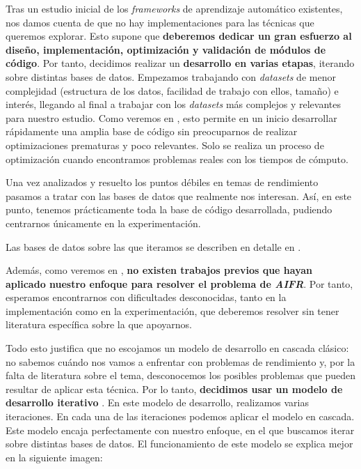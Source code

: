 Tras un estudio inicial de los \textit{frameworks} de aprendizaje automático existentes, nos damos cuenta de que no hay implementaciones para las técnicas que queremos explorar. Esto supone que \textbf{deberemos dedicar un gran esfuerzo al diseño, implementación, optimización y validación de módulos de código}. Por tanto, decidimos realizar un \textbf{desarrollo en varias etapas}, iterando sobre distintas bases de datos. Empezamos trabajando con \textit{datasets} de menor complejidad (estructura de los datos, facilidad de trabajo con ellos, tamaño) e interés, llegando al final a trabajar con los \textit{datasets} más complejos y relevantes para nuestro estudio. Como veremos en , esto permite en un inicio desarrollar rápidamente una amplia base de código sin preocuparnos de realizar optimizaciones prematuras y poco relevantes. Solo se realiza un proceso de optimización cuando encontramos problemas reales con los tiempos de cómputo.

Una vez analizados y resuelto los puntos débiles en temas de rendimiento pasamos a tratar con las bases de datos que realmente nos interesan. Así, en este punto, tenemos prácticamente toda la base de código desarrollada, pudiendo centrarnos únicamente en la experimentación.

Las bases de datos sobre las que iteramos se describen en detalle en .

Además, como veremos en , \textbf{no existen trabajos previos que hayan aplicado nuestro enfoque para resolver el problema de \textit{AIFR}}. Por tanto, esperamos encontrarnos con dificultades desconocidas, tanto en la implementación como en la experimentación, que deberemos resolver sin tener literatura específica sobre la que apoyarnos.

Todo esto justifica que no escojamos un modelo de desarrollo en cascada clásico: no sabemos cuándo nos vamos a enfrentar con problemas de rendimiento y, por la falta de literatura sobre el tema, desconocemos los posibles problemas que pueden resultar de aplicar esta técnica. Por lo tanto, \textbf{decidimos usar un modelo de desarrollo iterativo} \cite{informatica:libro_metodologias_desarrollo}. En este modelo de desarrollo, realizamos varias iteraciones. En cada una de las iteraciones podemos aplicar el modelo en cascada. Este modelo encaja perfectamente con nuestro enfoque, en el que buscamos iterar sobre distintas bases de datos. El funcionamiento de este modelo se explica mejor en la siguiente imagen:

